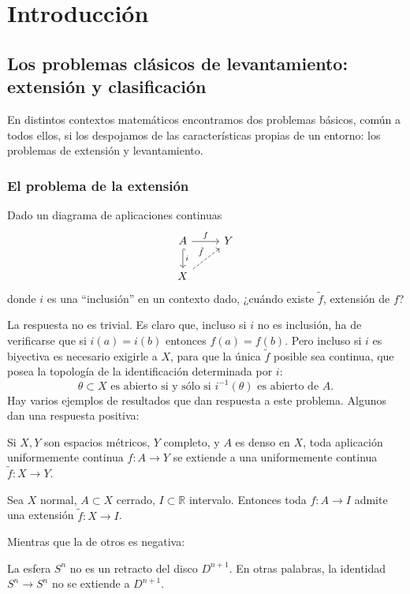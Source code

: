 \chapter{Introducción} 
\section{Los problemas clásicos de levantamiento: extensión y clasificación}
En distintos contextos matemáticos encontramos dos problemas básicos, común a todos ellos, si los despojamos de las características propias de un entorno: los problemas de extensión y levantamiento. \par

\subsection*{El problema de la extensión} 
Dado un diagrama de aplicaciones continuas 
$$
\begin{tikzcd}
	A \rar{f} \dar[hook]{i} & Y \\
	X \urar[dashed]{\tilde{f}}	&
\end{tikzcd} 
$$
donde $i$ es una ``inclusión'' en un contexto dado, ¿cuándo existe $\tilde{f}$, extensión de $f$? \par

La respuesta no es trivial. Es claro que, incluso si $i$ no es inclusión, ha de verificarse que si $i(a)= i(b)$ entonces $f(a) = f(b)$. Pero incluso si $i$ es biyectiva es necesario exigirle a $X$, para que la única $\tilde{f}$ posible sea continua, que posea la topología de la identificación determinada por $i$: 
$$
\theta \subset X \text{ es abierto si y sólo si } i^{-1} (\theta) \text{ es abierto de } A. 
$$
\newpage
Hay varios ejemplos de resultados que dan respuesta a este problema. Algunos dan una respuesta positiva:
\begin{teor} 
Si $X,Y$ son espacios métricos, $Y$ completo, y $A$ es denso en $X$, toda aplicación uniformemente continua $f:A\longrightarrow Y $ se extiende a una uniformemente continua $\tilde{f} : X \rightarrow Y$.
\end{teor} 

\begin{teor}
Sea $X$ normal, $A \subset X$ cerrado, $I \subset \mathbb{R}$ intervalo. Entonces toda $f : A \rightarrow I $  admite una extensión $\tilde{f} : X \rightarrow I$.
\end{teor}
Mientras que la de otros es negativa:
\begin{teor} 
La esfera $S^{n}$ no es un retracto del disco $D^{n+1}$. En otras palabras, la identidad $S^{n} \rightarrow S^{n}$ no se extiende a $D^{n+1}$.
\end{teor}

